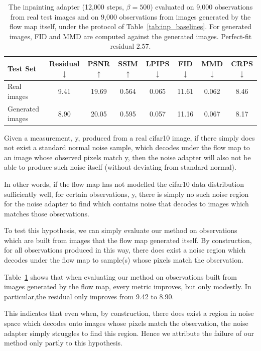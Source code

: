 \documentclass[12pt,a4paper]{report}
\begin{document}
\begin{table}[t]
\centering
\footnotesize
\setlength{\tabcolsep}{4pt}
\begin{tabular}{l ccccccc}
\toprule
Test Set & Residual $\downarrow$ & PSNR $\uparrow$ & SSIM $\uparrow$ & LPIPS $\downarrow$ & FID $\downarrow$ & MMD $\downarrow$ & CRPS $\downarrow$ \\
\midrule
Real images       & 9.41 & 19.69 & 0.564 & 0.065 & 11.61 & 0.062 & 8.46 \\
Generated images  & 8.90 & 20.05 & 0.595 & 0.057 & 11.16 & 0.067 & 8.17 \\
\bottomrule
\end{tabular}
\caption{The inpainting adapter (12{,}000 steps, $\beta = 500$) evaluated on
9{,}000 observations from real test images and on 9{,}000 observations from
images generated by the flow map itself, under the protocol of
Table~\ref{tab:inp_baselines}. For generated images, FID and MMD are computed
against the generated images. Perfect-fit residual $2.57$.}
\label{tab:h2_gen_vs_real}
\end{table}


Given a measurement, y, produced from a real cifar10 image, if there simply does not exist a standard normal noise sample, which decodes under the flow map to an image whose observed pixels match y, then the noise adapter will also not be able to produce such noise itself (without deviating from standard normal). 

In other words, if the flow map has not modelled the cifar10 data distribution sufficiently well, for certain observations, y, there is simply no such noise region for the noise adapter to find which contains noise that decodes to images which matches those observations. 

To test this hypothesis, we can simply evaluate our method on observations which are built from images that the flow map generated itself. 
By construction, for all observations produced in this way, there does exist a noise region which decodes under the flow map to sample(s) whose pixels match the observation. 

Table~\ref{tab:h2_gen_vs_real} shows that when evaluating our method on observations built from images generated by the flow map, every metric improves, but only modestly. In particular,the residual only improves from 9.42 to 8.90.  

This indicates that even when, by construction, there does exist a region in noise space which decodes onto images whose pixels match the observation, the noise adapter simply struggles to find this region. 
Hence we attribute the failure of our method only partly to this hypothesis. 
\end{document}
